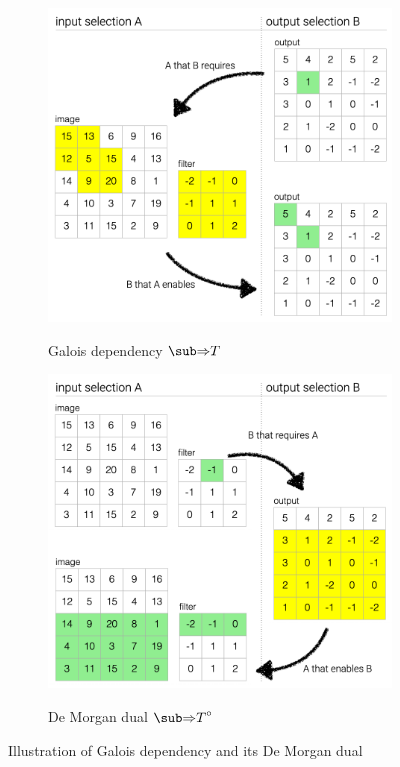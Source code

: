 \begin{figure}
   \begin{subfigure}{0.53\textwidth}
      {\includegraphics[scale=0.38]{fig/example/4-relations-1.png}}
      \vspace{2mm}
      \caption{Galois dependency $\evalGC{T}$}
      \label{fig:example:convolve-viz:galois-dependency}
   \end{subfigure}
   \begin{subfigure}{0.46\textwidth}
      {\includegraphics[scale=0.38]{fig/example/4-relations-2.png}}
      \vspace{2mm}
      \caption{De Morgan dual $\dual{\evalGC{T}}$}
      \label{fig:example:convolve-viz:de-morgan-dual}
   \end{subfigure}
   \caption{Illustration of Galois dependency and its De Morgan dual}
   \label{fig:example:convolve-viz}
\end{figure}
